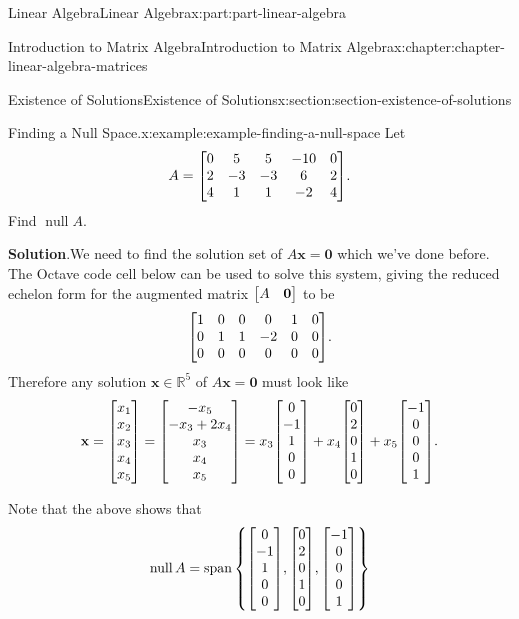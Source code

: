 \documentclass[twoside,10pt,]{book}
\newcommand{\blocktitlefont}{\relax}
\numberwithin{equation}{part}
\newcommand{\RR}{\mathbb{R}}
\providecommand{\vb}[1]{\mathbf{#1}}
\newcommand{\nul}[1]{\operatorname{null}{#1}}
\newcommand{\spn}[1]{\operatorname{span}{#1}}
\begin{document}
\begin{partptx}{Linear Algebra}{}{Linear Algebra}{}{}{x:part:part-linear-algebra}
\begin{chapterptx}{Introduction to Matrix Algebra}{}{Introduction to Matrix Algebra}{}{}{x:chapter:chapter-linear-algebra-matrices}
\begin{sectionptx}{Existence of Solutions}{}{Existence of Solutions}{}{}{x:section:section-existence-of-solutions}
\begin{example}{Finding a Null Space.}{x:example:example-finding-a-null-space}
Let%
\begin{equation*}
A = \mqty[0 & 5 & 5 & -10 & 0 \\ 2 & -3 & -3 & 6 & 2 \\ 4 & 1 & 1 & -2 & 4].
\end{equation*}
Find \(\nul{A}\).%
\par\smallskip%
\noindent\textbf{\blocktitlefont Solution}.\hypertarget{g:solution:idm1653026968}{}\quad{}We need to find the solution set of \(A\vb{x} = \vb{0}\) which we've done before. The Octave code cell below can be used to solve this system, giving the reduced echelon form for the augmented matrix \(\mqty[A & \vb{0}]\) to be%
\begin{equation*}
\mqty[1 & 0 & 0 & 0 & 1 & 0 \\ 0 & 1 & 1 & -2 & 0 & 0 \\ 0 & 0 & 0 & 0 & 0 & 0].
\end{equation*}
Therefore any solution \(\vb{x}\in\RR^5\) of \(A\vb{x}=\vb{0}\) must look like%
\begin{equation*}
\vb{x} = \mqty[x_1\\x_2\\x_3\\x_4\\x_5] = \mqty[-x_5\\-x_3+2x_4\\x_3\\x_4\\x_5] = x_3\mqty[0\\-1\\1\\0\\0] + x_4\mqty[0\\2\\0\\1\\0] + x_5\mqty[-1\\0\\0\\0\\1].
\end{equation*}
%
\par
Note that the above shows that%
\begin{equation*}
\nul{A} = \spn{\qty{\mqty[0\\-1\\1\\0\\0], \mqty[0\\2\\0\\1\\0], \mqty[-1\\0\\0\\0\\1]}}

\end{equation*}
\end{example}
\end{sectionptx}
\end{chapterptx}
\end{partptx}
\end{document}
